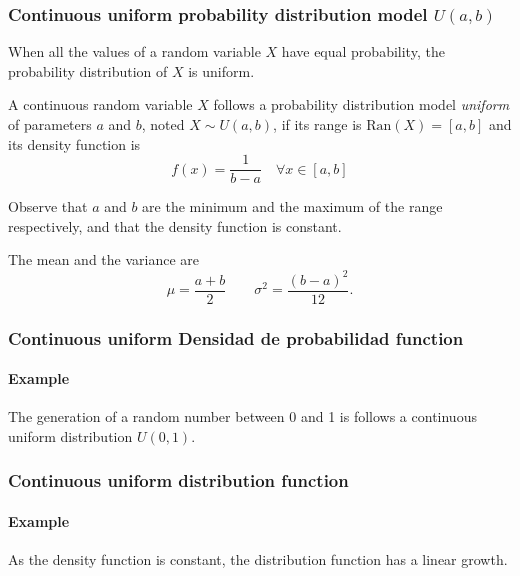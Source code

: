 \begin{frame}
\frametitle{Continuous uniform probability distribution model $U(a,b)$}
When all the values of a random variable $X$ have equal probability, the probability distribution of $X$ is uniform.

\begin{definition}
A continuous random variable $X$ follows a probability distribution model \emph{uniform} of parameters $a$ and
$b$, noted $X\sim U(a,b)$, if its range is $\mbox{Ran}(X) = [a,b]$ and its density function is
\[
f(x)= \frac{1}{b-a}\quad \forall x\in [a,b]
\]
\end{definition}

Observe that $a$ and $b$ are the minimum and the maximum of the range respectively, and that the density function is constant. 

The mean and the variance are
\[
\mu = \frac{a+b}{2}\qquad \sigma^2=\frac{(b-a)^2}{12}.
\]
\end{frame}


\begin{frame}
\frametitle{Continuous uniform Densidad de probabilidad function}
\framesubtitle{Example}

The generation of a random number between 0 and 1 is follows a continuous uniform distribution $U(0,1)$.
\begin{center}
\end{center}
\end{frame}


\begin{frame}
\frametitle{Continuous uniform distribution function}
\framesubtitle{Example}
As the density function is constant, the distribution function has a linear growth. 
\begin{center}
\end{center}
\end{frame}


